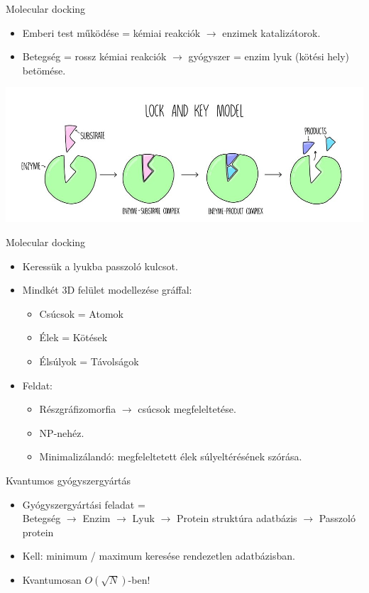 \documentclass[aspectratio=169]{beamer}
\begin{document}
\begin{frame}{Molecular docking}
\begin{itemize}
    \item Emberi test működése = kémiai reakciók $\rightarrow$ enzimek katalizátorok.
    \item Betegség = rossz kémiai reakciók $\rightarrow$ gyógyszer = enzim lyuk (kötési hely) betömése.
\end{itemize}
\begin{center}
\includegraphics[width=\linewidth]{./dipterv1_figures/lock_and_key_model.jpg}
\end{center}
\end{frame}

\begin{frame}{Molecular docking}
\begin{itemize}
    \item Keressük a lyukba passzoló kulcsot.
    \item Mindkét 3D felület modellezése gráffal:
    \begin{itemize}
        \item Csúcsok = Atomok
        \item Élek = Kötések
        \item Élsúlyok = Távolságok
    \end{itemize}
    \item Feldat:
    \begin{itemize}
        \item Részgráfizomorfia $\rightarrow$ csúcsok megfeleltetése.
        \item NP-nehéz.
        \item Minimalizálandó: megfeleltetett élek súlyeltérésének szórása.
    \end{itemize}
\end{itemize}
\end{frame}

\begin{frame}{Kvantumos gyógyszergyártás}
\begin{itemize}
    \item Gyógyszergyártási feladat = \\
          Betegség $\rightarrow$ Enzim $\rightarrow$ Lyuk $\rightarrow$ Protein struktúra adatbázis $\rightarrow$ Passzoló protein
    \item Kell: minimum / maximum keresése rendezetlen adatbázisban.
    \item Kvantumosan $O(\sqrt{N})$-ben!
\end{itemize}
\end{frame}
\end{document}
